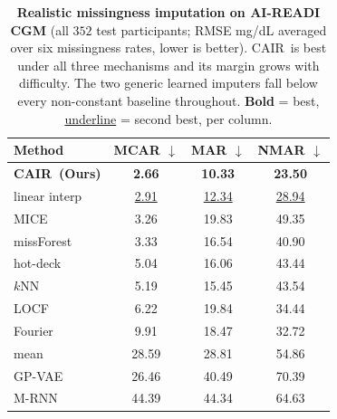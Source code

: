 \begin{table}[t]
  \centering
  {\small
  \setlength{\tabcolsep}{5pt}
  \begin{tabular}{lccc}
    \toprule
    Method & MCAR $\downarrow$ & MAR $\downarrow$ & NMAR $\downarrow$ \\
    \midrule
    \textbf{CAIR\ (Ours)} & \textbf{2.66} & \textbf{10.33} & \textbf{23.50} \\
    \midrule
    linear interp & \underline{2.91} & \underline{12.34} & \underline{28.94} \\
    MICE          & 3.26 & 19.83 & 49.35 \\
    missForest    & 3.33 & 16.54 & 40.90 \\
    hot-deck      & 5.04 & 16.06 & 43.44 \\
    $k$NN         & 5.19 & 15.45 & 43.54 \\
    LOCF          & 6.22 & 19.84 & 34.44 \\
    Fourier       & 9.91 & 18.47 & 32.72 \\
    mean          & 28.59 & 28.81 & 54.86 \\
    GP-VAE        & 26.46 & 40.49 & 70.39 \\
    M-RNN         & 44.39 & 44.34 & 64.63 \\
    \bottomrule
  \end{tabular}}
  \caption{\textbf{Realistic missingness imputation on AI-READI CGM} (all $352$ test
  participants; RMSE mg/dL averaged over six missingness rates, lower is
  better). CAIR\ is best under all three mechanisms and its margin grows with
  difficulty. The two generic learned imputers fall below every non-constant
  baseline throughout. \textbf{Bold} = best, \underline{underline} = second best, per column.}
  \label{tab:mech}
\end{table}

